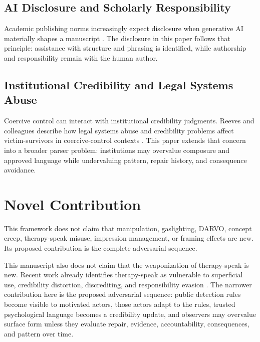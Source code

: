 \documentclass[11pt, letterpaper]{article}
\begin{document}
\subsection{AI Disclosure and Scholarly Responsibility}

Academic publishing norms increasingly expect disclosure when generative AI materially shapes a manuscript \cite{Perkins2024,Cleland2026}. The disclosure in this paper follows that principle: assistance with structure and phrasing is identified, while authorship and responsibility remain with the human author.

\subsection{Institutional Credibility and Legal Systems Abuse}

Coercive control can interact with institutional credibility judgments. Reeves and colleagues describe how legal systems abuse and credibility problems affect victim-survivors in coercive-control contexts \cite{Reeves2025}. This paper extends that concern into a broader parser problem: institutions may overvalue composure and approved language while undervaluing pattern, repair history, and consequence avoidance.

\section{Novel Contribution}

This framework does not claim that manipulation, gaslighting, DARVO, concept creep, therapy-speak misuse, impression management, or framing effects are new. Its proposed contribution is the complete adversarial sequence.

This manuscript also does not claim that the weaponization of therapy-speak is new. Recent work already identifies therapy-speak as vulnerable to superficial use, credibility distortion, discrediting, and responsibility evasion \cite{IsernMas2025}. The narrower contribution here is the proposed adversarial sequence: public detection rules become visible to motivated actors, those actors adapt to the rules, trusted psychological language becomes a credibility update, and observers may overvalue surface form unless they evaluate repair, evidence, accountability, consequences, and pattern over time.
\end{document}
